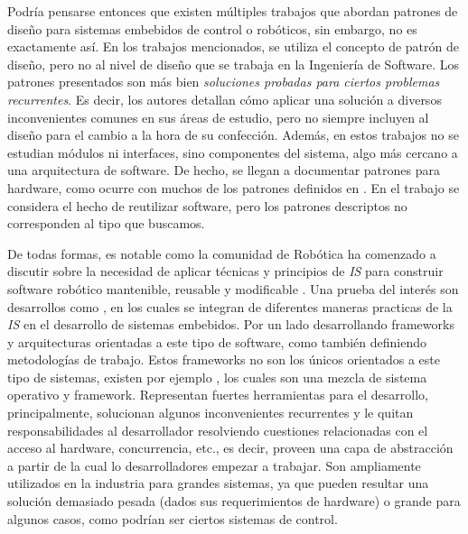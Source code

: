 Podría pensarse entonces que existen múltiples trabajos que abordan patrones de diseño para sistemas embebidos de control o robóticos, sin embargo, no es exactamente así. En los trabajos mencionados, se utiliza el concepto de patrón de diseño, pero no al nivel de diseño que se trabaja en la Ingeniería de Software. Los patrones presentados son más bien \textit{soluciones probadas para ciertos problemas recurrentes}. Es decir, los autores detallan cómo aplicar una solución a diversos inconvenientes comunes en sus áreas de estudio, pero no siempre incluyen al diseño para el cambio a la hora de su confección. Además, en estos trabajos no se estudian módulos ni interfaces, sino componentes del sistema, algo más cercano a una arquitectura de software. De hecho, se llegan a documentar patrones para hardware, como ocurre con muchos de los patrones definidos en \cite{critical}. En el trabajo \cite{stable} se considera el hecho de reutilizar software, pero los patrones descriptos no corresponden al tipo que buscamos.

De todas formas, es notable como la comunidad de Robótica ha comenzado a discutir sobre la necesidad de aplicar técnicas y principios de \textit{IS} para construir software robótico mantenible, reusable y modificable \cite{mejoras-1, mejoras-2}. Una prueba del interés son desarrollos como \cite{FernandezMadrigal2003, model,model1,model2,model3}, en los cuales se integran de diferentes maneras practicas de la \textit{IS} en el desarrollo de sistemas embebidos. Por un lado desarrollando \glspl{framework} y arquitecturas orientadas a este tipo de software, como también definiendo metodologías de trabajo. Estos \glspl{framework} no son los únicos orientados a este tipo de sistemas, existen por ejemplo \cite{framework-1, framework-ros}, los cuales son una mezcla de sistema operativo y framework. Representan fuertes herramientas para el desarrollo, principalmente, solucionan algunos inconvenientes recurrentes y le quitan responsabilidades al desarrollador resolviendo cuestiones relacionadas con el acceso al hardware, concurrencia, etc., es decir, proveen una capa de abstracción a partir de la cual lo desarrolladores empezar a trabajar. Son ampliamente utilizados en la industria para grandes sistemas, ya que pueden resultar una solución demasiado pesada (dados sus requerimientos de hardware) o grande para algunos casos, como podrían ser ciertos sistemas de control.

